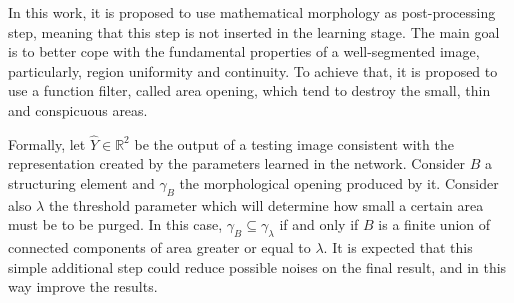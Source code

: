 In this work, it is proposed to use mathematical morphology as post-processing step, meaning that this step is not inserted in the learning stage. The main goal is to better cope with the fundamental properties of a well-segmented image, particularly, region uniformity and continuity. To achieve that, it is proposed to use a function filter, called area opening, which tend to destroy the small, thin and conspicuous areas.

Formally, let $\hat{Y}\in \mathbb{R}^2$ be the output of a testing image consistent with the representation created by the parameters learned in the network. Consider $B$ a structuring element and $\gamma_B$ the morphological opening produced by it. Consider also $\lambda$ the threshold parameter which will determine how small a certain area must be to be purged. In this case,  $\gamma_B \subseteq \gamma_\lambda$ if and only if $B$ is a finite union of connected components of area greater or equal to $\lambda$. It is expected that this simple additional step could reduce possible noises on the final result, and in this way improve the results.

 












